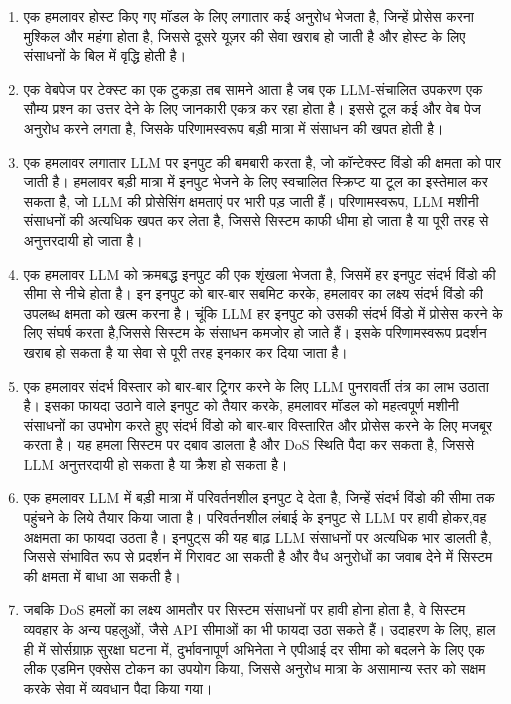 \documentclass[
]{article}
\providecommand{\tightlist}{%
  \setlength{\itemsep}{0pt}\setlength{\parskip}{0pt}}
\begin{document}
\begin{enumerate}
\def\labelenumi{\arabic{enumi}.}
\tightlist
\item
  एक हमलावर होस्ट किए गए मॉडल के लिए लगातार कई अनुरोध भेजता है, जिन्हें प्रोसेस
  करना मुश्किल और महंगा होता है, जिससे दूसरे यूज़र की सेवा खराब हो जाती है और होस्ट
  के लिए संसाधनों के बिल में वृद्धि होती है।
\item
  एक वेबपेज पर टेक्स्ट का एक टुकड़ा तब सामने आता है जब एक LLM-संचालित उपकरण एक
  सौम्य प्रश्न का उत्तर देने के लिए जानकारी एकत्र कर रहा होता है। इससे टूल कई और वेब
  पेज अनुरोध करने लगता है, जिसके परिणामस्वरूप बड़ी मात्रा में संसाधन की खपत होती है।
\item
  एक हमलावर लगातार LLM पर इनपुट की बमबारी करता है, जो कॉन्टेक्स्ट विंडो की
  क्षमता को पार जाती है। हमलावर बड़ी मात्रा में इनपुट भेजने के लिए स्वचालित स्क्रिप्ट
  या टूल का इस्तेमाल कर सकता है, जो LLM की प्रोसेसिंग क्षमताएं पर भारी पड़ जाती हैं।
  परिणामस्वरूप, LLM मशीनी संसाधनों की अत्यधिक खपत कर लेता है, जिससे सिस्टम काफी
  धीमा हो जाता है या पूरी तरह से अनुत्तरदायी हो जाता है।
\item
  एक हमलावर LLM को क्रमबद्ध इनपुट की एक शृंखला भेजता है, जिसमें हर इनपुट संदर्भ विंडो
  की सीमा से नीचे होता है। इन इनपुट को बार-बार सबमिट करके, हमलावर का लक्ष्य
  संदर्भ विंडो की उपलब्ध क्षमता को खत्म करना है। चूंकि LLM हर इनपुट को उसकी संदर्भ
  विंडो में प्रोसेस करने के लिए संघर्ष करता है,जिससे सिस्टम के संसाधन कमजोर हो जाते हैं।
  इसके परिणामस्वरूप प्रदर्शन खराब हो सकता है या सेवा से पूरी तरह इनकार कर दिया
  जाता है।
\item
  एक हमलावर संदर्भ विस्तार को बार-बार ट्रिगर करने के लिए LLM पुनरावर्ती तंत्र का
  लाभ उठाता है। इसका फायदा उठाने वाले इनपुट को तैयार करके, हमलावर मॉडल को
  महत्वपूर्ण मशीनी संसाधनों का उपभोग करते हुए संदर्भ विंडो को बार-बार विस्तारित और
  प्रोसेस करने के लिए मजबूर करता है। यह हमला सिस्टम पर दबाव डालता है और DoS
  स्थिति पैदा कर सकता है, जिससे LLM अनुत्तरदायी हो सकता है या क्रैश हो सकता है।
\item
  एक हमलावर LLM में बड़ी मात्रा में परिवर्तनशील इनपुट दे देता है, जिन्हें संदर्भ विंडो की
  सीमा तक पहुंचने के लिये तैयार किया जाता है। परिवर्तनशील लंबाई के इनपुट से LLM पर
  हावी होकर,वह अक्षमता का फायदा उठता है। इनपुट्स की यह बाढ़ LLM संसाधनों पर
  अत्यधिक भार डालती है, जिससे संभावित रूप से प्रदर्शन में गिरावट आ सकती है और वैध
  अनुरोधों का जवाब देने में सिस्टम की क्षमता में बाधा आ सकती है।
\item
  जबकि DoS हमलों का लक्ष्य आमतौर पर सिस्टम संसाधनों पर हावी होना होता है, वे
  सिस्टम व्यवहार के अन्य पहलुओं, जैसे API सीमाओं का भी फायदा उठा सकते हैं। उदाहरण के
  लिए, हाल ही में सोर्सग्राफ़ सुरक्षा घटना में, दुर्भावनापूर्ण अभिनेता ने एपीआई दर सीमा
  को बदलने के लिए एक लीक एडमिन एक्सेस टोकन का उपयोग किया, जिससे अनुरोध मात्रा के
  असामान्य स्तर को सक्षम करके सेवा में व्यवधान पैदा किया गया।
\end{enumerate}
\end{document}
